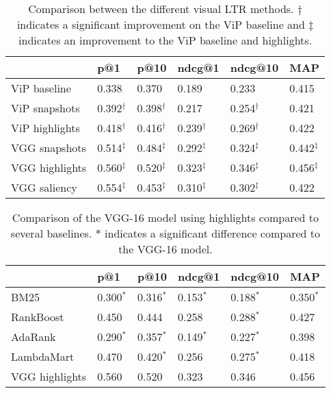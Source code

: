 
\begin{table}[h]
\caption{Comparison between the different visual \ac{LTR} methods. $\dagger$ indicates a significant improvement on the ViP baseline and $\ddagger$ indicates an improvement to the ViP baseline and highlights.}
\label{tab:visresults}
\centering
\begin{tabular}{llllll}
\toprule
                      & p@1    & p@10  & ndcg@1  & ndcg@10 & MAP   \\ 
\midrule
ViP baseline          & 0.338  & 0.370 & 0.189   & 0.233   & 0.415 \\ 
\midrule
ViP snapshots         & 0.392$^\dagger$ & 0.398$^\dagger$ & 0.217   & 0.254$^\dagger$   & 0.421 \\ 
ViP highlights        & 0.418$^\dagger$  & 0.416$^\dagger$ & 0.239$^\dagger$   & 0.269$^\dagger$   & 0.422 \\
\midrule
VGG snapshots      & 0.514$^\ddagger$    & 0.484$^\ddagger$ & 0.292$^\ddagger$   & 0.324$^\ddagger$   & 0.442$^\ddagger$ \\ 
VGG highlights     & 0.560$^\ddagger$    & 0.520$^\ddagger$ & 0.323$^\ddagger$   & 0.346$^\ddagger$   & 0.456$^\ddagger$ \\ 
\midrule
VGG saliency       & 0.554$^\ddagger$    & 0.453$^\ddagger$ & 0.310$^\ddagger$   & 0.302$^\ddagger$   & 0.422 \\ 
\bottomrule
\end{tabular}
\end{table}

\begin{table}[h]
\caption{Comparison of the VGG-16 model using highlights compared to several baselines. $*$ indicates a significant difference compared to the VGG-16 model. }

\label{tab:baseresults}
\begin{tabular}{llllll}
\toprule
                      & p@1    & p@10  & ndcg@1  & ndcg@10 & MAP   \\
\midrule
BM25                  & 0.300$^*$  & 0.316$^*$ & 0.153$^*$   & 0.188$^*$   & 0.350$^*$ \\ 
\midrule
RankBoost             & 0.450  & 0.444 & 0.258   & 0.288$^*$    & 0.427 \\
AdaRank               & 0.290$^*$   & 0.357$^*$  & 0.149$^*$    & 0.227$^*$    & 0.398 \\
LambdaMart            & 0.470  & 0.420$^*$ & 0.256   & 0.275$^*$    & 0.418 \\ 
\midrule
VGG highlights        & 0.560  & 0.520 & 0.323   & 0.346   & 0.456 \\ 
\bottomrule
\end{tabular}
\end{table}


